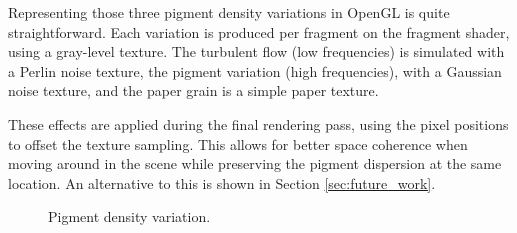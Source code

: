 \documentclass{article}
\begin{document}
\medskip \par
\noindent

\medskip \par
\noindent
Representing those three pigment density variations in OpenGL is quite straightforward. Each variation is produced per fragment on the fragment shader, using a gray-level
texture. The turbulent flow (low frequencies) is simulated with a Perlin noise texture, the pigment variation 
(high frequencies), with a Gaussian noise texture, and the paper grain is a simple paper texture.

\medskip \par
\noindent
These effects are applied during the final rendering pass, using the pixel positions to offset the texture sampling.
This allows for better space coherence when moving around in the scene while preserving the pigment dispersion at 
the same location. An alternative to this is shown in Section \ref{sec:future_work}.

\vspace{-1em}
\begin{figure}[h]
	\centering
	\hspace{0.5em}
	\hspace{0.5em}
	\hspace{0.5em}
	\caption{Pigment density variation.}
	\label{fig:paper_effects}
\end{figure}
\end{document}
